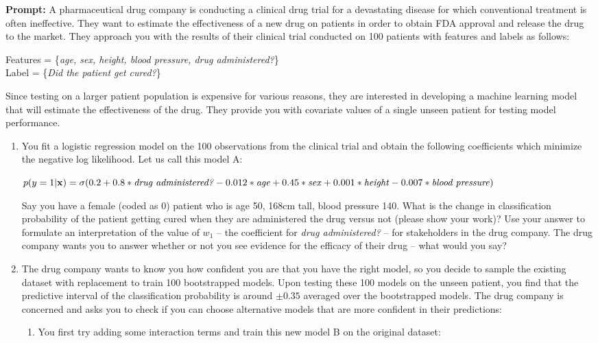 \documentclass[submit]{harvardml}
\begin{document}
\begin{problem}

\textbf{Prompt:} A pharmaceutical drug company is conducting a clinical drug trial for a devastating disease for which conventional treatment is often ineffective. They want to estimate the effectiveness of a new drug on patients in order to obtain FDA approval and release the drug to the market. They approach you with the results of their clinical trial conducted on 100 patients with features and labels as follows:

Features = \{\textit{age, sex, height, blood pressure, drug administered?}\} \\
Label = \{\textit{Did the patient get cured?}\}

Since testing on a larger patient population is expensive for various reasons, they are interested in developing a machine learning model that will estimate the effectiveness of the drug. They provide you with covariate values of a single unseen patient for testing model performance. 

\begin{enumerate}
    \item You fit a logistic regression model on the 100 observations from the clinical trial and obtain the following coefficients which minimize the negative log likelihood. Let us call this model A:

    $p(y=1 | \mathbf{x}) = \sigma(0.2 + 0.8 *\text{\textit{drug administered?}} - 0.012 *\text{\textit{age}} + 0.45*\text{\textit{sex}} +  0.001*\text{\textit{height}} - 0.007*\text{\textit{blood pressure}})$

    Say you have a female (coded as 0) patient who is age 50, 168cm tall, blood pressure 140. What is the change in classification probability of the patient getting cured when they are administered the drug versus not (please show your work)?  Use your answer to formulate an interpretation of the value of $w_1$ -- the coefficient for \textit{drug administered?} -- for stakeholders in the drug company. The drug company wants you to answer whether or not you see evidence for the efficacy of their drug -- what would you say?

    \item The drug company wants to know you how confident you are that you have the right model, so you decide to sample the existing dataset with replacement to train 100 bootstrapped models. Upon testing these 100 models on the unseen patient, you find that the predictive interval of the classification probability is around $\pm 0.35$ averaged over the bootstrapped models. The drug company is concerned and asks you to check if you can choose alternative models that are more confident in their predictions:
    \begin{enumerate}
        \item You first try adding some interaction terms and train this new model B on the original dataset:


\end{enumerate}
\end{enumerate}
\end{problem}
\end{document}

